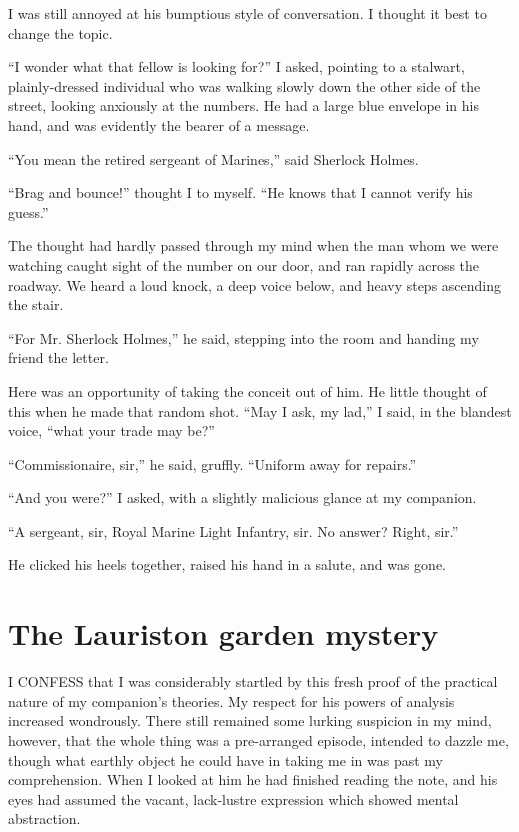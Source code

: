 \documentclass[12pt]{book}
\begin{document}
I was still annoyed at his bumptious style of conversation. I thought it best to change the topic. 

“I wonder what that fellow is looking for?” I asked, pointing to a stalwart, plainly-dressed individual who was walking slowly down the other side of the street, looking anxiously at the numbers. He had a large blue envelope in his hand, and was evidently the bearer of a message. 

“You mean the retired sergeant of Marines,” said Sherlock Holmes. 

“Brag and bounce!” thought I to myself. “He knows that I cannot verify his guess.” 

The thought had hardly passed through my mind when the man whom we were watching caught sight of the number on our door, and ran rapidly across the roadway. We heard a loud knock, a deep voice below, and heavy steps ascending the stair. 

“For Mr. Sherlock Holmes,” he said, stepping into the room and handing my friend the letter. 

Here was an opportunity of taking the conceit out of him. He little thought of this when he made that random shot. “May I ask, my lad,” I said, in the blandest voice, “what your trade may be?” 

“Commissionaire, sir,” he said, gruffly. “Uniform away for repairs.” 

“And you were?” I asked, with a slightly malicious glance at my companion. 

“A sergeant, sir, Royal Marine Light Infantry, sir. No answer? Right, sir.” 

He clicked his heels together, raised his hand in a salute, and was gone. 







\chapter{The Lauriston garden mystery}

I CONFESS that I was considerably startled by this fresh proof of the practical nature of my companion’s theories. My respect for his powers of analysis increased wondrously. There still remained some lurking suspicion in my mind, however, that the whole thing was a pre-arranged episode, intended to dazzle me, though what earthly object he could have in taking me in was past my comprehension. When I looked at him he had finished reading the note, and his eyes had assumed the vacant, lack-lustre expression which showed mental abstraction. 
\end{document}
